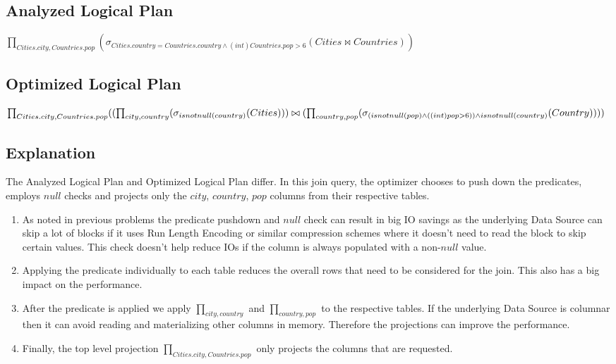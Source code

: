 \documentclass[12pt]{article}
\begin{document}
\subsection*{Analyzed Logical Plan}

$\prod_{Cities.city, Countries.pop}(\sigma_{Cities.country = Countries.country \wedge (int) Countries.pop > 6}(Cities \bowtie Countries))$

\subsection*{Optimized Logical Plan}

$\prod_{Cities.city, Countries.pop}((\prod_{city, country}(\sigma_{isnotnull(country)}(Cities))) \bowtie \\
 (\prod_{country, pop}(\sigma_{(isnotnull(pop) \wedge ((int) pop > 6)) \wedge isnotnull(country)}(Country))))$


\subsection*{Explanation}

The Analyzed Logical Plan and Optimized Logical Plan differ. In this join query, the optimizer chooses to push down the predicates, employs $null$ checks and projects only the $city$, $country$, $pop$ columns from their respective tables.

\begin{enumerate}

\item As noted in previous problems the predicate pushdown and $null$ check can result in big IO savings as the underlying Data Source can skip a lot of blocks if it uses Run Length Encoding or similar compression schemes where it doesn't need to read the block to skip certain values. This check doesn't help reduce IOs if the column is always populated with a non-$null$ value.

\item Applying the predicate individually to each table reduces the overall rows that need to be considered for the join. This also has a big impact on the performance.

\item After the predicate is applied we apply $\prod_{city, country}$ and $\prod_{country, pop}$ to the respective tables. If the underlying Data Source is columnar then it can avoid reading and materializing other columns in memory. Therefore the projections can improve the performance.

\item Finally, the top level projection $\prod_{Cities.city, Countries.pop}$ only projects the columns that are requested.

\end{enumerate}
\end{document}
